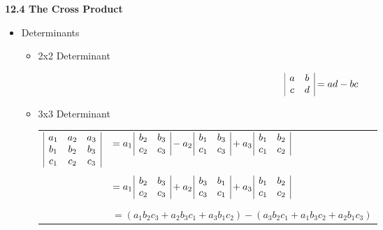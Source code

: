 \newpage

\centerline{\bf 12.4 The Cross Product}
  
    \begin{itemize}
    \item Determinants
      \begin{itemize}
      \item 2x2 Determinant
      
      \[
\begin{array}{|c c|}
a & b \\
c & d \\
\end{array}
      = ad - bc
      \]
      
      \item 3x3 Determinant

\begin{center}\begin{tabular}{rl}
  $
    \begin{array}{|c c c|}
    a_1 & a_2 & a_3 \\
    b_1 & b_2 & b_3 \\
    c_1 & c_2 & c_3 \\
    \end{array}
  $
  &
  $
      = a_1 \,
    \begin{array}{|c c|}
    b_2 & b_3 \\
    c_2 & c_3 \\
    \end{array}
      - a_2 \,
    \begin{array}{|c c|}
    b_1 & b_3 \\
    c_1 & c_3 \\
    \end{array}
      + a_3 \,
    \begin{array}{|c c|}
    b_1 & b_2 \\
    c_1 & c_2 \\
    \end{array}
  $
  \\ [1ex] \\ &
  $
     = a_1 \,
    \begin{array}{|c c|}
    b_2 & b_3 \\
    c_2 & c_3 \\
    \end{array}
      + a_2 \,
    \begin{array}{|c c|}
    b_3 & b_1 \\
    c_3 & c_1 \\
    \end{array}
      + a_3 \,
    \begin{array}{|c c|}
    b_1 & b_2 \\
    c_1 & c_2 \\
    \end{array}
  $
  \\ [1ex] \\ &
  $= (a_1b_2c_3 + a_2b_3c_1 + a_3b_1c_2) - (a_3b_2c_1 + a_1b_3c_2 + a_2b_1c_3)$
\end{tabular}\end{center}
      

\end{itemize}
\end{itemize}
